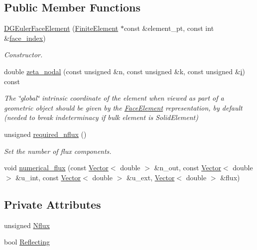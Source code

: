 \subsection*{Public Member Functions}
\begin{DoxyCompactItemize}
\item 
\hyperlink{classoomph_1_1DGEulerFaceElement_aca3a63a2db78b06d13272c3f8f137616}{D\+G\+Euler\+Face\+Element} (\hyperlink{classoomph_1_1FiniteElement}{Finite\+Element} $\ast$const \&element\+\_\+pt, const int \&\hyperlink{classoomph_1_1FaceElement_a478d577ac6db67ecc80f1f02ae3ab170}{face\+\_\+index})
\begin{DoxyCompactList}\small\item\em Constructor. \end{DoxyCompactList}\item 
double \hyperlink{classoomph_1_1DGEulerFaceElement_af109fc02678e54552d8a63407731ddb1}{zeta\+\_\+nodal} (const unsigned \&n, const unsigned \&k, const unsigned \&\hyperlink{cfortran_8h_adb50e893b86b3e55e751a42eab3cba82}{i}) const
\begin{DoxyCompactList}\small\item\em The \char`\"{}global\char`\"{} intrinsic coordinate of the element when viewed as part of a geometric object should be given by the \hyperlink{classoomph_1_1FaceElement}{Face\+Element} representation, by default (needed to break indeterminacy if bulk element is Solid\+Element) \end{DoxyCompactList}\item 
unsigned \hyperlink{classoomph_1_1DGEulerFaceElement_aa20647527c6e5dc1febb13e575d971bb}{required\+\_\+nflux} ()
\begin{DoxyCompactList}\small\item\em Set the number of flux components. \end{DoxyCompactList}\item 
void \hyperlink{classoomph_1_1DGEulerFaceElement_a44655910de79b442bfffaefe0152f776}{numerical\+\_\+flux} (const \hyperlink{classoomph_1_1Vector}{Vector}$<$ double $>$ \&n\+\_\+out, const \hyperlink{classoomph_1_1Vector}{Vector}$<$ double $>$ \&u\+\_\+int, const \hyperlink{classoomph_1_1Vector}{Vector}$<$ double $>$ \&u\+\_\+ext, \hyperlink{classoomph_1_1Vector}{Vector}$<$ double $>$ \&flux)
\end{DoxyCompactItemize}
\subsection*{Private Attributes}
\begin{DoxyCompactItemize}
\item 
unsigned \hyperlink{classoomph_1_1DGEulerFaceElement_ab2c9036ce56daafed333108febfa2f7b}{Nflux}
\item 
bool \hyperlink{classoomph_1_1DGEulerFaceElement_aaed16dc9edc6e846d8fc5f569bfa3044}{Reflecting}
\end{DoxyCompactItemize}
